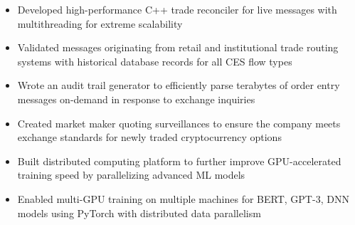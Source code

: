 \documentclass[11pt,letterpaper]{article}
\begin{document}
  {\fontsize{12}{12}}

  \begin{itemize}
    \item{Developed high-performance C++ trade reconciler for live messages with multithreading for extreme scalability}
    \item{Validated messages originating from retail and institutional trade routing systems with historical database records for all CES flow types}
  \end{itemize}

  {\fontsize{12}{12}}

  \begin{itemize}
    \item{Wrote an audit trail generator to efficiently parse terabytes of order entry messages on-demand in response to exchange inquiries}
    \item{Created market maker quoting surveillances to ensure the company meets exchange standards for newly traded cryptocurrency options}
  \end{itemize}

  {\fontsize{12}{12}}

  \begin{itemize}
    \item{Built distributed computing platform to further improve GPU-accelerated training speed by parallelizing advanced ML models}
    \item{Enabled multi-GPU training on multiple machines for BERT, GPT-3, DNN models using PyTorch with distributed data parallelism}
  \end{itemize}

  {\fontsize{12}{12}}
\end{document}
